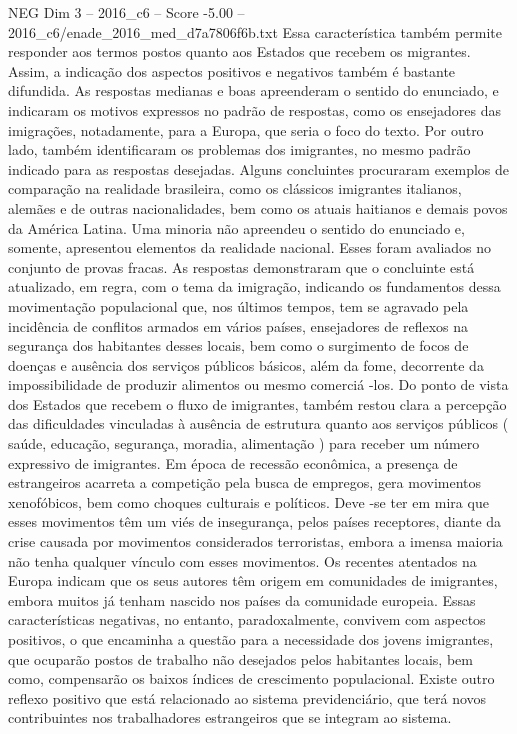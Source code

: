 \begin{textsample}{NEG Dim 3 – 2016\_c6 – Score -5.00 – 2016\_c6/enade\_2016\_med\_d7a7806f6b.txt}
Essa característica também permite responder aos termos postos quanto aos Estados que recebem os migrantes.
Assim, a indicação dos aspectos positivos e negativos também é bastante difundida.
As respostas medianas e boas apreenderam o sentido do enunciado, e indicaram os motivos expressos no padrão de respostas, como os ensejadores das imigrações, notadamente, para a Europa, que seria o foco do texto.
Por outro lado, também identificaram os problemas dos imigrantes, no mesmo padrão indicado para as respostas desejadas.
Alguns concluintes procuraram exemplos de comparação na realidade brasileira, como os clássicos imigrantes italianos, alemães e de outras nacionalidades, bem como os atuais haitianos e demais povos da América Latina.
Uma minoria não apreendeu o sentido do enunciado e, somente, apresentou elementos da realidade nacional.
Esses foram avaliados no conjunto de provas fracas.
As respostas demonstraram que o concluinte está atualizado, em regra, com o tema da imigração, indicando os fundamentos dessa movimentação populacional que, nos últimos tempos, tem se agravado pela incidência de conflitos armados em vários países, ensejadores de reflexos na segurança dos habitantes desses locais, bem como o surgimento de focos de doenças e ausência dos serviços públicos básicos, além da fome, decorrente da impossibilidade de produzir alimentos ou mesmo comerciá -los.
Do ponto de vista dos Estados que recebem o fluxo de imigrantes, também restou clara a percepção das dificuldades vinculadas à ausência de estrutura quanto aos serviços públicos ( saúde, educação, segurança, moradia, alimentação ) para receber um número expressivo de imigrantes.
Em época de recessão econômica, a presença de estrangeiros acarreta a competição pela busca de empregos, gera movimentos xenofóbicos, bem como choques culturais e políticos.
Deve -se ter em mira que esses movimentos têm um viés de insegurança, pelos países receptores, diante da crise causada por movimentos considerados terroristas, embora a imensa maioria não tenha qualquer vínculo com esses movimentos.
Os recentes atentados na Europa indicam que os seus autores têm origem em comunidades de imigrantes, embora muitos já tenham nascido nos países da comunidade europeia.
Essas características negativas, no entanto, paradoxalmente, convivem com aspectos positivos, o que encaminha a questão para a necessidade dos jovens imigrantes, que ocuparão postos de trabalho não desejados pelos habitantes locais, bem como, compensarão os baixos índices de crescimento populacional.
Existe outro reflexo positivo que está relacionado ao sistema previdenciário, que terá novos contribuintes nos trabalhadores estrangeiros que se integram ao sistema.

\end{textsample}
